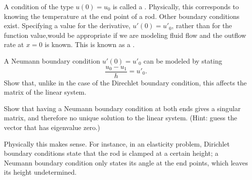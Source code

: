   A condition of the type $u(0)=u_0$ is called a . Physically, this corresponds to knowing the
  temperature at the end point of a rod. Other boundary conditions
  exist. Specifying a value for the derivative, $u'(0)=u'_0$, rather
  than for the function value,would be appropriate if we are modeling
  fluid flow and the outflow rate at $x=0$ is known. This is known as
  a .

  A Neumann boundary condition $u'(0)=u'_0$ can be modeled by stating
  \[ \frac{u_0-u_1}h=u'_0. \]
  Show that, unlike in the case of the Direchlet boundary condition,
  this affects the matrix of the linear system.

  Show that having a
  Neumann boundary condition at both ends gives a singular
  matrix, and therefore no unique solution to the linear system.
  (Hint: guess the vector that has eigenvalue zero.)

  Physically this makes sense. For instance, in an elasticity problem,
  Dirichlet boundary conditions state that the rod is clamped at a
  certain height; a Neumann boundary condition only states its angle
  at the end points, which leaves its height undetermined.
